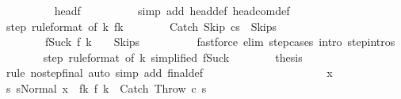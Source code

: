 \begin{isabellebody}
\ \ \ \ \ \ \ \ \isamarkupfalse%
\ head{\isacharunderscore}f{\isacharunderscore}{}\isanewline
\ \ \ \ \ \ \ \ \isamarkupfalse%
\ {\isacharparenleft}simp\ add{\isacharcolon}\ head{\isacharunderscore}def\ head{\isacharunderscore}com{\isacharunderscore}def{\isacharparenright}\isanewline
\ \ \ \ \ \ \isamarkupfalse%
\isanewline
\ \ \ \ \ \ \isamarkupfalse%
\ step\ {\isacharbrackleft}rule{\isacharunderscore}format{\isacharcomma}\ of\ k{\isacharbrackright}\ f{\isacharunderscore}k\isanewline
\ \ \ \ \ \ \isamarkupfalse%
\ {\isachardoublequoteopen}{\isasymGamma}{\isasymturnstile}{\isacharparenleft}Catch\ Skip\ cs{\isacharprime}{\isacharparenright}\ {\isasymrightarrow}\ {\isacharparenleft}Skip{\isacharcomma}s{\isacharprime}{\isacharparenright}{\isachardoublequoteclose}\ \isanewline
\ \ \ \ \ \ \ \ f{\isacharunderscore}Suc{\isacharunderscore}k{\isacharcolon}\ {\isachardoublequoteopen}f\ {\isacharparenleft}k\ {\isacharplus}\ {}{\isacharparenright}\ {\isacharequal}\ {\isacharparenleft}Skip{\isacharcomma}s{\isacharprime}{\isacharparenright}{\isachardoublequoteclose}\isanewline
\ \ \ \ \ \ \ \ \isamarkupfalse%
\ {\isacharparenleft}fastforce\ elim{\isacharcolon}\ step{\isachardot}cases\ intro{\isacharcolon}\ step{\isachardot}intros{\isacharparenright}\isanewline
\ \ \ \ \ \ \isamarkupfalse%
\ step\ {\isacharbrackleft}rule{\isacharunderscore}format{\isacharcomma}\ of\ {\isachardoublequoteopen}k{\isacharplus}{}{\isachardoublequoteclose}{\isacharcomma}\ simplified\ f{\isacharunderscore}Suc{\isacharunderscore}k{\isacharbrackright}\isanewline
\ \ \ \ \ \ \isamarkupfalse%
\ {\isacharquery}thesis\isanewline
\ \ \ \ \ \ \ \ \isamarkupfalse%
\ {\isacharparenleft}rule\ no{\isacharunderscore}step{\isacharunderscore}final{\isacharprime}{\isacharparenright}\ {\isacharparenleft}auto\ simp\ add{\isacharcolon}\ final{\isacharunderscore}def{\isacharparenright}\isanewline
\ \ \ \ \isacommand{{\isacharbraceright}}\isamarkupfalse%
\isanewline
\ \ \ \ \isamarkupfalse%
\isanewline
\ \ \ \ \isacommand{{\isacharbraceleft}}\isamarkupfalse%
\isanewline
\ \ \ \ \ \ \isamarkupfalse%
\ x\isanewline
\ \ \ \ \ \ \isamarkupfalse%
\ s{\isacharprime}{\isacharcolon}\ {\isachardoublequoteopen}s{\isacharprime}{\isacharequal}Normal\ x{\isachardoublequoteclose}\ \ f{\isacharunderscore}k{\isacharcolon}\ {\isachardoublequoteopen}f\ k\ {\isacharequal}\ {\isacharparenleft}Catch\ Throw\ c\ s{\isacharprime}{\isacharparenright}{\isachardoublequoteclose}\isanewline

\end{isabellebody}
